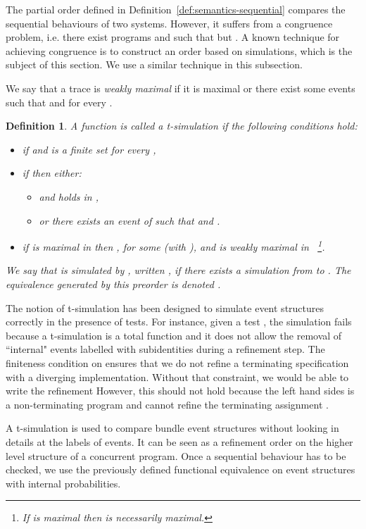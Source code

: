 \documentclass[review]{elsart}
\newtheorem{definition}{Definition}[section]
\begin{document}
The partial order defined in Definition~\ref{def:semantics-sequential} compares the sequential behaviours of two systems. However, it suffers from a congruence problem, i.e. there exist programs  and  such that  but . A known technique for achieving congruence is to construct an order based on simulations, which is the subject of this section. We use a similar technique in this subsection.

We say that a trace  is \emph{weakly maximal} if it is maximal or there exist some events  such that  and  for every . 

\begin{definition}\label{def:t-simulation}
A function  is called a \emph{t-simulation} if the following conditions hold:
\begin{itemize}
\item[-] if  and  is a finite set for every ,
\item[-] if  then either:
\begin{itemize}
\item  and  holds in ,
\item or there exists an event  of  such that  and .
\end{itemize} 
\item[-] if  is maximal in  then , for some  (with ), and  is weakly maximal in ~\footnote{If  is maximal then  is necessarily maximal.}.
\end{itemize}
We say that  is simulated by , written , if there exists a simulation from  to . The equivalence generated by this preorder is denoted .
\end{definition}



The notion of t-simulation has been designed to simulate event structures correctly in the presence of tests. For instance, given a test , the simulation  fails because a t-simulation is a total function and it does not allow the removal of ``internal" events labelled with subidentities during a refinement step. The finiteness condition on  ensures that we do not refine a terminating specification with a diverging implementation. Without that constraint, we would be able to write the refinement 
However, this should not hold because the left hand sides is a non-terminating program and cannot refine the terminating assignment .

A t-simulation is used to compare bundle event structures without looking in details at the labels of events. It can be seen as a refinement order on the higher level structure of a concurrent program.  Once a sequential behaviour has to be checked, we use the previously defined functional equivalence on event structures with internal probabilities.
\end{document}

